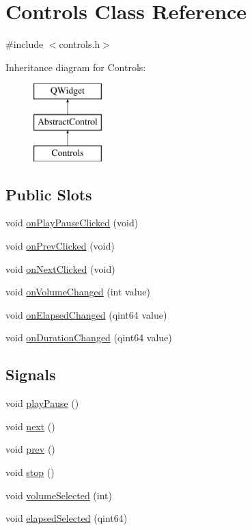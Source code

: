 \hypertarget{class_controls}{\section{Controls Class Reference}
\label{class_controls}
}


{\ttfamily \#include $<$controls.\-h$>$}

Inheritance diagram for Controls\-:\begin{figure}[H]
\begin{center}
\leavevmode
\includegraphics[height=3.000000cm]{class_controls}
\end{center}
\end{figure}
\subsection*{Public Slots}
\begin{DoxyCompactItemize}
\item 
void \hyperlink{class_controls_ae5e221035bf36156c77c629fe4be453d}{on\-Play\-Pause\-Clicked} (void)
\item 
void \hyperlink{class_controls_a48610eb52367be6c7509457244821335}{on\-Prev\-Clicked} (void)
\item 
void \hyperlink{class_controls_a4e7c1ea477ffeb066399d48404ede8b0}{on\-Next\-Clicked} (void)
\item 
void \hyperlink{class_controls_af599078654027314f33d922ce601a054}{on\-Volume\-Changed} (int value)
\item 
void \hyperlink{class_controls_a09f5f92331f2531ead8a02612ae60127}{on\-Elapsed\-Changed} (qint64 value)
\item 
void \hyperlink{class_controls_a7abbbb170c237e803401311c012492ba}{on\-Duration\-Changed} (qint64 value)
\end{DoxyCompactItemize}
\subsection*{Signals}
\begin{DoxyCompactItemize}
\item 
void \hyperlink{class_controls_afe7504ad0f381214c4183e5be814abc4}{play\-Pause} ()
\item 
void \hyperlink{class_controls_af74535d8202bfdb9049eb58f7d13e690}{next} ()
\item 
void \hyperlink{class_controls_a166980f14fdc874aecbd5b96ee631888}{prev} ()
\item 
void \hyperlink{class_controls_abcd261c1a0fe72dc44eb49bebbe0931a}{stop} ()
\item 
void \hyperlink{class_controls_ab4219d5113b05a478c25c5c41203eaf7}{volume\-Selected} (int)
\item 
void \hyperlink{class_controls_ac44bbe30565ace7514dbb2d0337419a6}{elapsed\-Selected} (qint64)
\end{DoxyCompactItemize}
